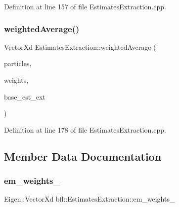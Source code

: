 Definition at line 157 of file Estimates\+Extraction.\+cpp.

\mbox{\label{classbfl_1_1EstimatesExtraction_ade9a34ad46d2f68f0e98f52035b21f3c}} 
\subsubsection{\texorpdfstring{weighted\+Average()}{weightedAverage()}}
{\footnotesize\ttfamily Vector\+Xd Estimates\+Extraction\+::weighted\+Average (\begin{DoxyParamCaption}\item[{const Eigen\+::\+Ref$<$ const Eigen\+::\+Matrix\+Xd $>$ \&}]{particles,  }\item[{const Eigen\+::\+Ref$<$ const Eigen\+::\+Vector\+Xd $>$ \&}]{weights,  }\item[{const \mbox{\hyperlink{classbfl_1_1EstimatesExtraction_a8c0593a43166c569530947107c830462}{Statistics}} \&}]{base\+\_\+est\+\_\+ext }\end{DoxyParamCaption})\hspace{0.3cm}{\ttfamily [protected]}}



Definition at line 178 of file Estimates\+Extraction.\+cpp.



\subsection{Member Data Documentation}
\mbox{\label{classbfl_1_1EstimatesExtraction_af14ee077a6ff541973570a1f8ede9382}} 
\subsubsection{\texorpdfstring{em\+\_\+weights\+\_\+}{em\_weights\_}}
{\footnotesize\ttfamily Eigen\+::\+Vector\+Xd bfl\+::\+Estimates\+Extraction\+::em\+\_\+weights\+\_\+\hspace{0.3cm}{\ttfamily [protected]}}



